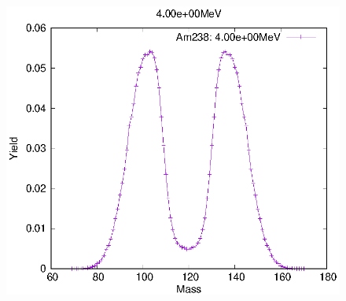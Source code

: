 \begin{figure}[htbp]
\begin{minipage}{0.33\textwidth} \begin{center} \includegraphics[width=\textwidth]{YA/Am238_4.00e+00.eps} \end{center} \end{minipage}
\end{figure}
